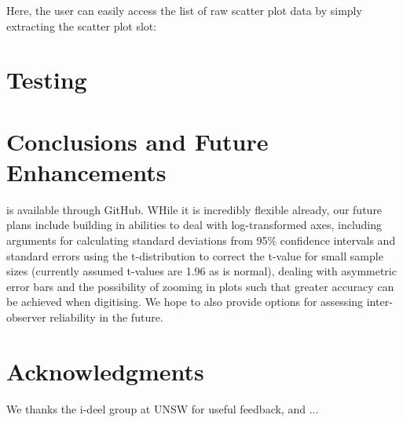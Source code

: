\documentclass[article]{jss}
\begin{document}
Here, the user can easily access the list of raw scatter plot data by simply extracting the scatter plot slot:

\begin{CodeChunk}
\end{CodeChunk}



\section{Testing}

\section{Conclusions and Future Enhancements}

 is available through GitHub. WHile it is incredibly flexible already, our future plans include building in abilities to deal with log-transformed axes, including arguments for calculating standard deviations from 95\% confidence intervals and standard errors using the t-distribution to correct the t-value for small sample sizes (currently assumed t-values are 1.96 as is normal), dealing with asymmetric error bars and the possibility of zooming in plots such that greater accuracy can be achieved when digitising. We hope to also provide options for assessing inter-observer reliability in the future. 


\section*{Acknowledgments}
We thanks the i-deel group at UNSW for useful feedback, and ...



\end{document}
